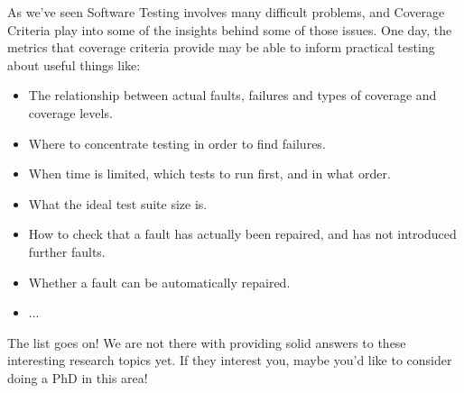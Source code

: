 As we've seen Software Testing involves many difficult problems, and Coverage
Criteria play into some of the insights behind some of those issues. One day,
the metrics that coverage criteria provide may be able to inform practical
testing about useful things like:

\begin{itemize}

    \item The relationship between actual faults, failures and types of coverage
    and coverage levels.

    \item Where to concentrate testing in order to find failures.

    \item When time is limited, which tests to run first, and in what order.

    \item What the ideal test suite size is.
    
    \item How to check that a fault has actually been repaired, and has not
    introduced further faults. 
    
    \item Whether a fault can be automatically repaired.

    \item ... 

\end{itemize}    

The list goes on! We are not there with providing solid answers to these
interesting research topics yet. If they interest you, maybe you'd like to
consider doing a PhD in this area!


